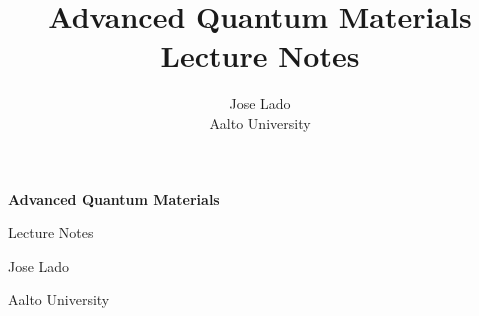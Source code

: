 \documentclass[11pt]{report}
\title{\Huge Advanced Quantum Materials\\[0.4em]\Large Lecture Notes}
\author{Jose Lado\\[0.2em]\normalsize Aalto University}
\date{}
\begin{document}
\begin{titlepage}
\centering
\vspace*{4cm}
{\Huge\bfseries Advanced Quantum Materials\par}
\vspace{0.6cm}
{\Large Lecture Notes\par}
\vspace{2cm}
{\large Jose Lado\par}
{\large Aalto University\par}
\vfill
\end{titlepage}

\tableofcontents











\end{document}
